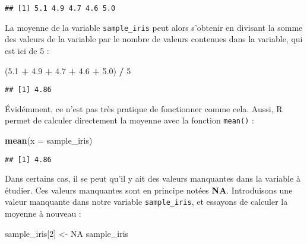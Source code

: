 \documentclass[
  french,
]{book}
\newenvironment{Shaded}{\begin{snugshade}}{\end{snugshade}}
\newcommand{\DataTypeTok}[1]{\textcolor[rgb]{0.13,0.29,0.53}{#1}}
\newcommand{\DecValTok}[1]{\textcolor[rgb]{0.00,0.00,0.81}{#1}}
\newcommand{\FloatTok}[1]{\textcolor[rgb]{0.00,0.00,0.81}{#1}}
\newcommand{\KeywordTok}[1]{\textcolor[rgb]{0.13,0.29,0.53}{\textbf{#1}}}
\newcommand{\NormalTok}[1]{#1}
\newcommand{\OperatorTok}[1]{\textcolor[rgb]{0.81,0.36,0.00}{\textbf{#1}}}
\newcommand{\OtherTok}[1]{\textcolor[rgb]{0.56,0.35,0.01}{#1}}
\newcommand{\StringTok}[1]{\textcolor[rgb]{0.31,0.60,0.02}{#1}}
\begin{document}
\begin{Shaded}
\end{Shaded}

\begin{verbatim}
## [1] 5.1 4.9 4.7 4.6 5.0
\end{verbatim}

La moyenne de la variable \texttt{sample\_iris} peut alors s'obtenir en divisant la somme des valeurs de la variable par le nombre de valeurs contenues dans la variable, qui est ici de 5 :

\begin{Shaded}
\begin{Highlighting}[]
\NormalTok{(}\FloatTok{5.1} \OperatorTok{+}\StringTok{ }\FloatTok{4.9} \OperatorTok{+}\StringTok{ }\FloatTok{4.7} \OperatorTok{+}\StringTok{ }\FloatTok{4.6} \OperatorTok{+}\StringTok{ }\FloatTok{5.0}\NormalTok{) }\OperatorTok{/}\StringTok{ }\DecValTok{5}
\end{Highlighting}
\end{Shaded}

\begin{verbatim}
## [1] 4.86
\end{verbatim}

Évidémment, ce n'est pas très pratique de fonctionner comme cela. Aussi, R permet de calculer directement la moyenne avec la fonction \texttt{mean()} :

\begin{Shaded}
\begin{Highlighting}[]
\KeywordTok{mean}\NormalTok{(}\DataTypeTok{x =}\NormalTok{ sample_iris)}
\end{Highlighting}
\end{Shaded}

\begin{verbatim}
## [1] 4.86
\end{verbatim}

Dans certains cas, il se peut qu'il y ait des valeurs manquantes dans la variable à étudier. Ces valeurs manquantes sont en principe notées \textbf{NA}. Introduisons une valeur manquante dans notre variable \texttt{sample\_iris}, et essayons de calculer la moyenne à nouveau :

\begin{Shaded}
\begin{Highlighting}[]
\NormalTok{sample_iris[}\DecValTok{2}\NormalTok{] <-}\StringTok{ }\OtherTok{NA}
\NormalTok{sample_iris}
\end{Highlighting}
\end{Shaded}
\end{document}
